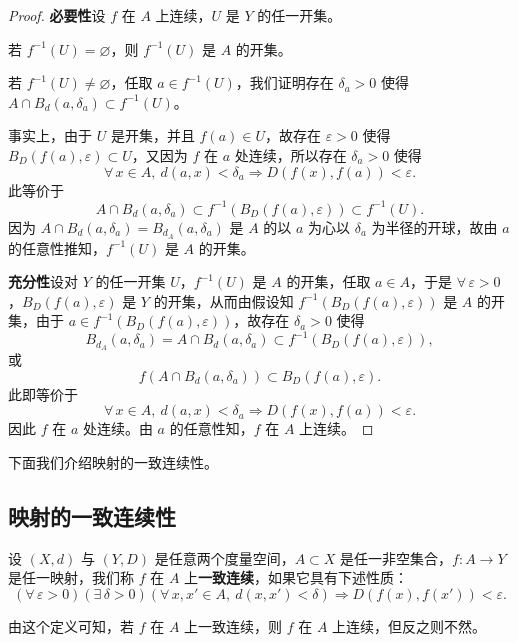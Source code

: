 \begin{proof}

\textbf{必要性}\quad 设 $f$ 在 $A$ 上连续，$U$ 是 $Y$ 的任一开集。

若 $f^{-1}(U)=\varnothing$，则 $f^{-1}(U)$ 是 $A$ 的开集。

若 $f^{-1}(U)\neq\varnothing$，任取 $a\in f^{-1}(U)$，我们证明存在 $\delta_a>0$ 使得 $A\cap B_d(a,\delta_a)\subset f^{-1}(U)$。

事实上，由于 $U$ 是开集，并且 $f(a)\in U$，故存在 $\varepsilon>0$ 使得 $B_D(f(a),\varepsilon)\subset U$，又因为 $f$ 在 $a$ 处连续，所以存在 $\delta_a>0$ 使得
\[\forall\,x\in A,\ d(a,x)<\delta_a\Longrightarrow D(f(x),f(a))<\varepsilon.\]
此等价于
\[A\cap B_d(a,\delta_a)\subset f^{-1}(B_D(f(a),\varepsilon))\subset f^{-1}(U).\]
因为 $A\cap B_d(a,\delta_a)=B_{d_A}(a,\delta_a)$ 是 $A$ 的以 $a$ 为心以 $\delta_a$ 为半径的开球，故由 $a$ 的任意性推知，$f^{-1}(U)$ 是 $A$ 的开集。

\textbf{充分性}\quad 设对 $Y$ 的任一开集 $U$，$f^{-1}(U)$ 是 $A$ 的开集，任取 $a\in A$，于是 $\forall\,\varepsilon>0$，$B_D(f(a),\varepsilon)$ 是 $Y$ 的开集，从而由假设知 $f^{-1}(B_D(f(a),\varepsilon))$ 是 $A$ 的开集，由于 $a\in f^{-1}(B_D(f(a),\varepsilon))$，故存在 $\delta_a>0$ 使得
\[B_{d_A}(a,\delta_a)=A\cap B_d(a,\delta_a)\subset f^{-1}(B_D(f(a),\varepsilon)),\]
或
\[f(A\cap B_d(a,\delta_a))\subset B_D(f(a),\varepsilon).\]
此即等价于
\[\forall\,x\in A,\ d(a,x)<\delta_a\Longrightarrow D(f(x),f(a))<\varepsilon.\]
因此 $f$ 在 $a$ 处连续。由 $a$ 的任意性知，$f$ 在 $A$ 上连续。

\end{proof}

下面我们介绍映射的一致连续性。

\subsection{映射的一致连续性}

\begin{mydef*}{}

设 $(X,d)$ 与 $(Y,D)$ 是任意两个度量空间，$A\subset X$ 是任一非空集合，$f:A\to Y$ 是任一映射，我们称 $f$ 在 $A$ 上\textbf{一致连续}，如果它具有下述性质：
\[(\forall\,\varepsilon>0)(\exists\,\delta>0)(\forall\,x,x'\in A,\ d(x,x')<\delta)\Longrightarrow D(f(x),f(x'))<\varepsilon.\]

\end{mydef*}

由这个定义可知，若 $f$ 在 $A$ 上一致连续，则 $f$ 在 $A$ 上连续，但反之则不然。

